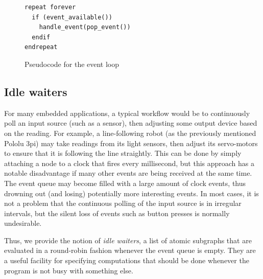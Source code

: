 \documentclass[a4paper, oneside, final]{memoir}
\begin{document}
\begin{figure}
\begin{verbatim}
repeat forever
  if (event_available())
    handle_event(pop_event())
  endif
endrepeat
\end{verbatim}
\caption{Pseudocode for the event loop}
\label{fig:eventloopcode}
\end{figure}

\subsection{Idle waiters}
\label{sec:idle waiters}
For many embedded applications, a typical workflow would be to
continuously poll an input source (such as a sensor), then adjusting
some output device based on the reading.  For example, a
line-following robot (as the previously mentioned Pololu 3pi) may take
readings from its light sensors, then adjust its servo-motors to
ensure that it is following the line straightly.  This can be done by
simply attaching a node to a clock that fires every millisecond, but
this approach has a notable disadvantage if many other events are
being received at the same time.  The event queue may become filled
with a large amount of clock events, thus drowning out (and losing)
potentially more interesting events.  In most cases, it is not a
problem that the continuous polling of the input source is in
irregular intervals, but the silent loss of events such as button
presses is normally undesirable.

Thus, we provide the notion of \textit{idle waiters}, a list of atomic
subgraphs that are evaluated in a round-robin fashion whenever the
event queue is empty.  They are a useful facility for specifying
computations that should be done whenever the program is not busy with
something else.
\end{document}
